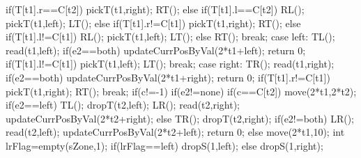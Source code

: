 {{{                if(T[t1].r==C[t2])
                {
                    pickT(t1,right);
                    RT();
                }
                else if(T[t1].l==C[t2])
                {
                    RL();
                    pickT(t1,left);
                    LT();
                }
                else if(T[t1].r!=C[t1])
                {
                    pickT(t1,right);
                    RT();
                }
                else if(T[t1].l!=C[t1])
                {
                    RL();
                    pickT(t1,left);
                    LT();
                }
                else
                {
                    RT();
                }
                break;
            case left:
                TL();
                read(t1,left);
                if(e2==both)
                {
                    updateCurrPosByVal(2*t1+left);
                    return 0;
                }
                if(T[t1].l!=C[t1])
                {
                    pickT(t1,left);
                }
                LT();
                break;
            case right:
                TR();
                read(t1,right);
                if(e2==both)
                {
                    updateCurrPosByVal(2*t1+right);
                    return 0;
                }
                if(T[t1].r!=C[t1])
                {
                    pickT(t1,right);
                }
                RT();
                break;
        }
        if(c!=-1)
        {
            if(e2!=none)
            {
                if(c==C[t2])
                {
                    move(2*t1,2*t2);
                    if(e2==left)
                    {
                        TL();
                        dropT(t2,left);
                        LR();
                        read(t2,right);
                        updateCurrPosByVal(2*t2+right);
                    }
                    else
                    {
                        TR();
                        dropT(t2,right);
                        if(e2!=both)
                        {
                            LR();
                            read(t2,left);
                            updateCurrPosByVal(2*t2+left);
                        }
                    }
                    return 0;
                }
                else
                {
                    move(2*t1,10);
                    int lrFlag=empty(sZone,1);
                    if(lrFlag==left)
                    {
                        dropS(1,left);
                    }
                    else
                        dropS(1,right);
}}}}}
